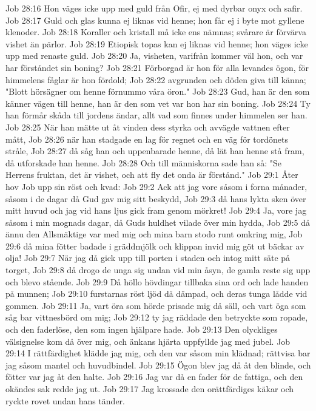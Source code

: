 Job 28:16  Hon väges icke upp med guld från Ofir, ej med dyrbar onyx och safir.
Job 28:17  Guld och glas kunna ej liknas vid henne; hon får ej i byte mot gyllene klenoder.
Job 28:18  Koraller och kristall må icke ens nämnas; svårare är förvärva vishet än pärlor.
Job 28:19  Etiopisk topas kan ej liknas vid henne; hon väges icke upp med renaste guld.
Job 28:20  Ja, visheten, varifrån kommer väl hon, och var har förståndet sin boning?
Job 28:21  Förborgad är hon för alla levandes ögon, för himmelens fåglar är hon fördold;
Job 28:22  avgrunden och döden giva till känna; "Blott hörsägner om henne förnummo våra öron."
Job 28:23  Gud, han är den som känner vägen till henne, han är den som vet var hon har sin boning.
Job 28:24  Ty han förmår skåda till jordens ändar, allt vad som finnes under himmelen ser han.
Job 28:25  När han mätte ut åt vinden dess styrka och avvägde vattnen efter mått,
Job 28:26  när han stadgade en lag för regnet och en väg för tordönets stråle,
Job 28:27  då såg han och uppenbarade henne, då lät han henne stå fram, då utforskade han henne.
Job 28:28  Och till människorna sade han så: "Se Herrens fruktan, det är vishet, och att fly det onda är förstånd."
Job 29:1  Åter hov Job upp sin röst och kvad:
Job 29:2  Ack att jag vore såsom i forna månader, såsom i de dagar då Gud gav mig sitt beskydd,
Job 29:3  då hans lykta sken över mitt huvud och jag vid hans ljus gick fram genom mörkret!
Job 29:4  Ja, vore jag såsom i min mognads dagar, då Guds huldhet vilade över min hydda,
Job 29:5  då ännu den Allsmäktige var med mig och mina barn stodo runt omkring mig,
Job 29:6  då mina fötter badade i gräddmjölk och klippan invid mig göt ut bäckar av olja!
Job 29:7  När jag då gick upp till porten i staden och intog mitt säte på torget,
Job 29:8  då drogo de unga sig undan vid min åsyn, de gamla reste sig upp och blevo stående.
Job 29:9  Då höllo hövdingar tillbaka sina ord och lade handen på munnen;
Job 29:10  furstarnas röst ljöd då dämpad, och deras tunga lådde vid gommen.
Job 29:11  Ja, vart öra som hörde prisade mig då säll, och vart öga som såg bar vittnesbörd om mig;
Job 29:12  ty jag räddade den betryckte som ropade, och den faderlöse, den som ingen hjälpare hade.
Job 29:13  Den olyckliges välsignelse kom då över mig, och änkans hjärta uppfyllde jag med jubel.
Job 29:14  I rättfärdighet klädde jag mig, och den var såsom min klädnad; rättvisa bar jag såsom mantel och huvudbindel.
Job 29:15  Ögon blev jag då åt den blinde, och fötter var jag åt den halte.
Job 29:16  Jag var då en fader för de fattiga, och den okändes sak redde jag ut.
Job 29:17  Jag krossade den orättfärdiges käkar och ryckte rovet undan hans tänder.

